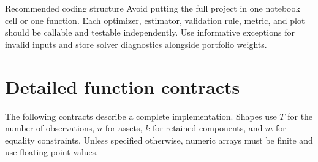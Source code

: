 \documentclass[10pt]{article}
\begin{document}
\begin{checkpointbox}{Recommended coding structure}
Avoid putting the full project in one notebook cell or one function. Each
optimizer, estimator, validation rule, metric, and plot should be callable and
testable independently. Use informative exceptions for invalid inputs and
store solver diagnostics alongside portfolio weights.
\end{checkpointbox}

\section{Detailed function contracts}

The following contracts describe a complete implementation. Shapes use
$T$ for the number of observations, $n$ for assets, $k$ for retained
components, and $m$ for equality constraints. Unless specified otherwise,
numeric arrays must be finite and use floating-point values.
\end{document}
